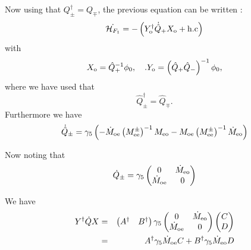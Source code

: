 \documentclass{article}[12pt]
\begin{document}
Now using that   $Q_{\pm} ^{\dagger} = Q_{\mp}$, the previous equation
can be written :
\begin{equation}
\dot{\mathcal{H}_{F_1}} = - \left(Y_{\rm{o}}^{\dagger} \dot{\hat{Q}}_{+} X_{\rm{o}}  + \rm{h.c}\right)
\end{equation}
with 
\begin{equation}
  X_{\rm{o}}=\hat{Q}_+^{-1}\phi_0,\quad. Y_{\rm{o}}= \left(\hat{Q}_+
    \hat{Q}_-\right)^{-1} \phi_0,
\end{equation}
where we have used that 
\begin{equation}
  \hat{Q}_\pm^{\dagger} = \hat{Q}_\mp.
\end{equation}
Furthermore we have 
\begin{equation}
\dot{\hat{Q}}_{\pm} =  \gamma_5 \left( -  \dot{M}_{\rm{oe}}
  \left(M^{\pm}_{\rm{ee}}\right)^{-1} M_{\rm{eo}} -  M_{\rm{oe}}
    \left(M^{\pm}_{\rm{ee}}\right)^{-1} \dot{M}_{\rm{eo}}\right)
\end{equation}

Now noting that  
\begin{equation}
  \dot{Q}_{\pm} =  \gamma_5 \begin{pmatrix} 
 0  & \dot{M}_{\rm{eo}} \\
\dot{M}_{\rm{oe}} & 0\\
\end{pmatrix}
\end{equation}

We have 
\begin{eqnarray}
  Y ^{\dagger} \dot{Q} X  &=& \begin{pmatrix} A^\dagger &
    B^\dagger \end{pmatrix} \gamma_5 \begin{pmatrix} 
 0  & \dot{M}_{\rm{eo}} \\
\dot{M}_{\rm{oe}} & 0\\
\end{pmatrix}  \begin{pmatrix} C \\  D \end{pmatrix} \\
&=&  A^\dagger \gamma_5 \dot{M}_{\rm{oe}}  C + B^\dagger \gamma_5 \dot{M}_{\rm{eo}} D
\end{eqnarray}
\end{document}
